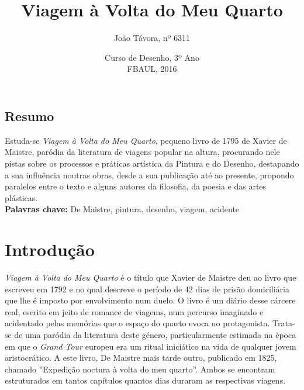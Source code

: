 \documentclass[12pt]{article}
\title{\large{Viagem à Volta do Meu Quarto}}
\author{\vspace*{-3ex}João Távora, nº 6311}
\date{\vspace*{-3ex}Curso de Desenho, 3º Ano\\\vspace*{-1ex}FBAUL, 2016}
\begin{document}

\maketitle

\renewcommand\contentsname{Sumário}
\tableofcontents

\begin{spacing}{1.0}
\begin{small}
  \section{Resumo}

    \noindent Estuda-se \emph{Viagem à Volta do Meu Quarto}, pequeno
    livro de 1795 de Xavier de Maistre, paródia da literatura de
    viagens popular na altura, procurando nele pistas sobre os
    processos e práticas artística da Pintura e do Desenho, destapando
    a sua influência noutras obras, desde a sua publicação até ao
    presente, propondo paralelos entre o texto e alguns autores da
    filosofia, da poesia e das artes plásticas.\\
    \noindent\textbf{Palavras chave:} De Maistre, pintura, desenho,
    viagem, acidente
    
\end{small}

\end{spacing}
\vspace*{-1ex}

\section{Introdução}

\emph{Viagem à Volta do Meu Quarto} é o título que Xavier de Maistre
deu ao livro que escreveu em 1792 e no qual descreve o período de 42
dias de prisão domiciliária que lhe é imposto por envolvimento num
duelo. O livro é um diário desse cárcere real, escrito em jeito de
romance de viagems, num percurso imaginado e acidentado pelas memórias
que o espaço do quarto evoca no protagonista. Trata-se de uma paródia
da literatura deste género, particularmente estimada na época em que o
\emph{Grand Tour} europeu era um ritual iniciático na vida de qualquer
jovem aristocrático. A este livro, De Maistre mais tarde outro,
publicado em 1825, chamado ''Expedição noctura à volta do meu
quarto''. Ambos se encontram estruturados em tantos capítulos quantos
dias duraram as respectivas viagens.
\end{document}
